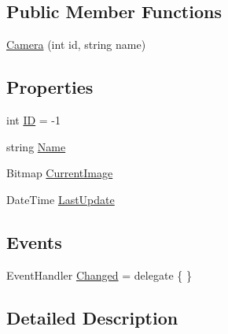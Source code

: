 \subsection*{Public Member Functions}
\begin{DoxyCompactItemize}
\item 
\mbox{\hyperlink{class_eagle_eye_1_1_models_1_1_camera_adcf152a7ad61686c8dd0a5ac919405b1}{Camera}} (int id, string name)
\end{DoxyCompactItemize}
\subsection*{Properties}
\begin{DoxyCompactItemize}
\item 
int \mbox{\hyperlink{class_eagle_eye_1_1_models_1_1_camera_af3877a74fe147e2a79cd97d6a1d983da}{ID}} = -\/1
\item 
string \mbox{\hyperlink{class_eagle_eye_1_1_models_1_1_camera_a45941e18deb09a8e294e7c858da9caa0}{Name}}
\item 
Bitmap \mbox{\hyperlink{class_eagle_eye_1_1_models_1_1_camera_a1a5cec582d29956df5f3f3b3cf03c542}{Current\+Image}}
\item 
Date\+Time \mbox{\hyperlink{class_eagle_eye_1_1_models_1_1_camera_ac9623f8d222175f53b06fa84420fa6cb}{Last\+Update}}
\end{DoxyCompactItemize}
\subsection*{Events}
\begin{DoxyCompactItemize}
\item 
Event\+Handler \mbox{\hyperlink{class_eagle_eye_1_1_models_1_1_camera_a4a8b47c765bd44f8ca6a89e59d3d3b94}{Changed}} = delegate \{ \}
\end{DoxyCompactItemize}


\subsection{Detailed Description}




